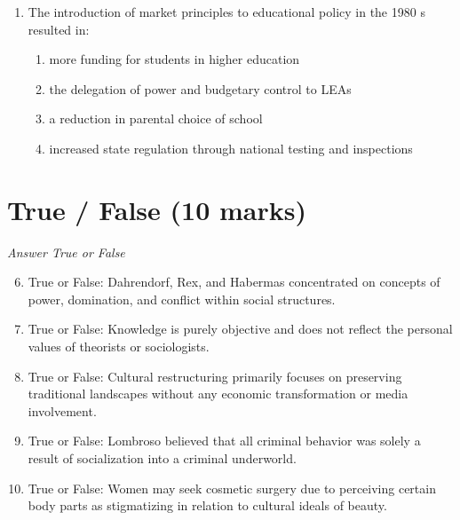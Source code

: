 \documentclass[12pt]{article}
\begin{document}
\begin{enumerate}[label=\arabic*.]
\begin{enumerate}[label=(\alph*)]
    \item its theories are logical, explicit and supported by empirical evidence
    \item sociologists collect data in a relatively objective and systematic way
    \item ideas and research findings are scrutinized by other sociologists
    \item all of the above
\end{enumerate}
\item The introduction of market principles to educational policy in the 1980 s resulted in:
\begin{enumerate}[label=(\alph*)]
    \item more funding for students in higher education
    \item the delegation of power and budgetary control to LEAs
    \item a reduction in parental choice of school
    \item increased state regulation through national testing and inspections
\end{enumerate}
\end{enumerate}

\section*{True / False (10 marks)}
\textit{Answer True or False}
\begin{enumerate}[label=\arabic*.]
\setcounter{enumi}{5}
\item True or False: Dahrendorf, Rex, and Habermas concentrated on concepts of power, domination, and conflict within social structures.
\item True or False: Knowledge is purely objective and does not reflect the personal values of theorists or sociologists.
\item True or False: Cultural restructuring primarily focuses on preserving traditional landscapes without any economic transformation or media involvement.
\item True or False: Lombroso believed that all criminal behavior was solely a result of socialization into a criminal underworld.
\item True or False: Women may seek cosmetic surgery due to perceiving certain body parts as stigmatizing in relation to cultural ideals of beauty.
\end{enumerate}
\end{document}
